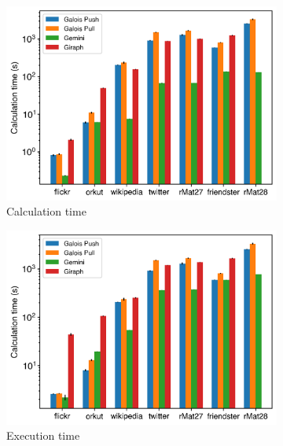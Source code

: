 \begin{figure}[h]
	\hfil
	\begin{subfigure}{0.32\textwidth}
		\includegraphics[width=\linewidth]{../../plots/distributedPR_calcTime.png}
		\caption{Calculation time}
		\label{fig:distributedPR_calc}
	\end{subfigure}
	\hfil
	\begin{subfigure}{0.32\textwidth}
		\includegraphics[width=\linewidth]{../../plots/distributedPR_execTime.png}
		\caption{Execution time}
		\label{fig:distributedPR_exec}
	\end{subfigure}
	\hfil
	\begin{subfigure}{0.32\textwidth}

\end{subfigure}
\end{figure}
